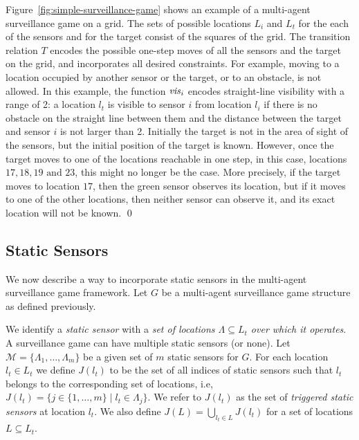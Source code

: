 \begin{example}\label{ex:simple-surveillance-game}
Figure~\ref{fig:simple-surveillance-game} shows an example of a multi-agent surveillance game on a grid.  The sets of possible locations $L_i$ and $L_t$ for the each of the sensors and for the target consist of the squares of the  grid. The transition relation $T$ encodes the possible one-step moves of all the sensors and the target on the grid, and incorporates all desired constraints. For example, moving to a location occupied by another sensor or the target, or to an obstacle, is not allowed.
In this example, the function $\mathit{vis}_i$ encodes straight-line visibility with a range of 2: a location $l_t$ is visible to sensor $i$ from location $l_i$ if there is no obstacle on the straight line between them and the distance between the target and sensor $i$ is not larger than 2. Initially the target is not in the area of sight of the sensors, but the initial position of the target is known. However, once the target moves to one of the locations reachable in one step, in this case, locations $17,18,19 \text{ and } 23$, this might no longer be the case. More precisely, if the target moves to location $17$, then the green sensor observes its location, but if it moves to one of the other locations, then neither sensor can observe it, and its exact location will not be known. \qed
\end{example}


\subsection{Static Sensors}
We now describe a way to incorporate static sensors in the multi-agent surveillance game framework. Let $G$ be a multi-agent surveillance game structure as defined previously.  

We identify a \emph{static sensor} with a \emph{set of locations $\Lambda \subseteq L_t$ over which it operates}. 
A surveillance game can have multiple static sensors (or none). Let $\mathcal{M} = \{\Lambda_1,\dots,\Lambda_m\}$ be a given set of $m$ static sensors for $G$. For each location $l_t \in L_t$ we define  $J(l_t)$ to be the set of all indices of static sensors such that $l_t$ belongs to the corresponding set of locations, i.e, $J(l_t) = \{j \in \{1,\ldots,m\}\mid l_t\in \Lambda_j\}$. We refer to $J(l_t)$ as the set of \emph{triggered static sensors} at location $l_t$. We also define $J(L) = \bigcup_{l_t \in L} J(l_t)$ for a set of locations $L \subseteq L_t$. 

